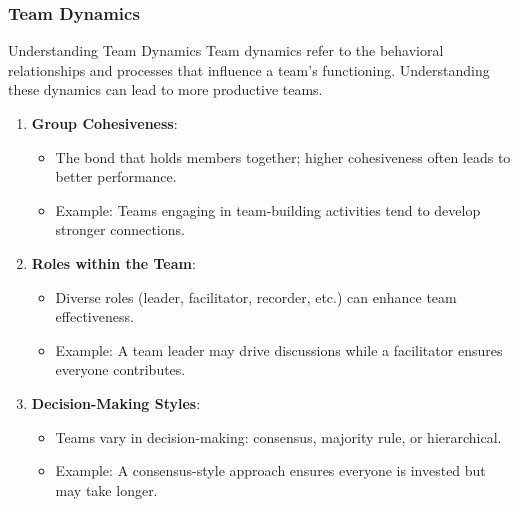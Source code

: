 \documentclass[aspectratio=169]{beamer}
\begin{document}
\begin{frame}[fragile]
    \frametitle{Team Dynamics}
    \begin{block}{Understanding Team Dynamics}
        Team dynamics refer to the behavioral relationships and processes that influence a team's functioning. Understanding these dynamics can lead to more productive teams.
    \end{block}

    \begin{enumerate}
        \item \textbf{Group Cohesiveness}:
            \begin{itemize}
                \item The bond that holds members together; higher cohesiveness often leads to better performance.
                \item Example: Teams engaging in team-building activities tend to develop stronger connections.
            \end{itemize}
        \item \textbf{Roles within the Team}:
            \begin{itemize}
                \item Diverse roles (leader, facilitator, recorder, etc.) can enhance team effectiveness.
                \item Example: A team leader may drive discussions while a facilitator ensures everyone contributes.
            \end{itemize}
        \item \textbf{Decision-Making Styles}:
            \begin{itemize}
                \item Teams vary in decision-making: consensus, majority rule, or hierarchical.
                \item Example: A consensus-style approach ensures everyone is invested but may take longer.
            \end{itemize}
    \end{enumerate}
\end{frame}
\end{document}
